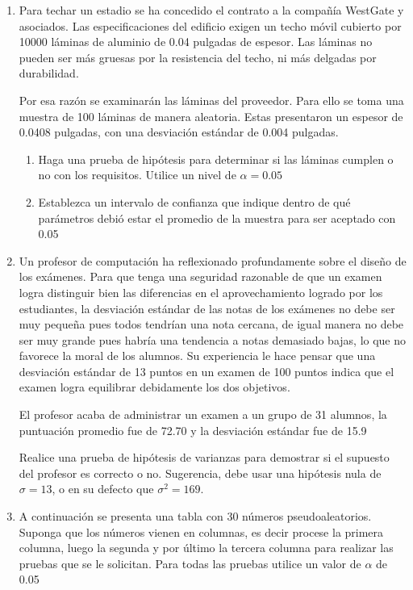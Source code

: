\begin{enumerate}


\item Para techar un estadio se ha concedido el contrato a la compañía WestGate y asociados. Las especificaciones del edificio exigen un techo móvil cubierto por 10000 láminas de aluminio de 0.04 pulgadas de espesor. Las láminas no pueden ser más gruesas por la resistencia del techo, ni más delgadas por durabilidad.

Por esa razón se examinarán las láminas del proveedor. Para ello se toma una muestra de 100 láminas de manera aleatoria. Estas presentaron un espesor de 0.0408 pulgadas, con una desviación estándar de 0.004 pulgadas.
\begin{enumerate}[label=\alph*.]
    \item Haga una prueba de hipótesis para determinar si las láminas cumplen o no con los requisitos. Utilice un nivel de $\alpha = 0.05$
    \item Establezca un intervalo de confianza que indique dentro de qué parámetros debió estar el promedio de la muestra para ser aceptado con 0.05
\end{enumerate}
\item Un profesor de computación ha reflexionado profundamente sobre el diseño de los exámenes. Para que tenga una seguridad razonable de que un examen logra distinguir bien las diferencias en el aprovechamiento logrado por los estudiantes, la desviación estándar de las notas de los exámenes no debe ser muy pequeña pues todos tendrían una nota cercana, de igual manera no debe ser muy grande pues habría una tendencia a notas demasiado bajas, lo que no favorece la moral de los alumnos. Su experiencia le hace pensar que una desviación estándar de 13 puntos en un examen de 100 puntos indica que el examen logra equilibrar debidamente los dos objetivos.

El profesor acaba de administrar un examen a un grupo de 31 alumnos, la puntuación promedio fue de 72.70 y la desviación estándar fue de 15.9 

Realice una prueba de hipótesis de varianzas para demostrar si el supuesto del profesor es correcto o no. Sugerencia, debe usar una hipótesis nula de $\sigma = 13$, o en su defecto que $\sigma^2 = 169$.



\item A continuación se presenta una tabla con 30 números pseudoaleatorios. Suponga que los números vienen en columnas, es decir procese la primera columna, luego la segunda y por último la tercera columna para realizar las pruebas que se le solicitan. Para todas las pruebas utilice un valor de $\alpha$ de 0.05


\end{enumerate}
